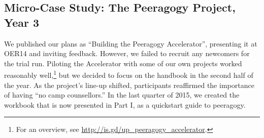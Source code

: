 \subsection{{\tiny Micro-}Case Study: The Peeragogy Project, Year 3}

We published our plans as ``Building the Peeragogy Accelerator'',
presenting it at OER14 and inviting feedback.  However, we failed to
recruit any newcomers for the trial run.  Piloting the Accelerator
with some of our own projects worked reasonably well,\footnote{For an
overview, see \url{http://is.gd/up_peeragogy_accelerator}.} but we
decided to focus on the handbook in the second half of the year.  As
the project's line-up shifted, participants reaffirmed the importance
of having ``no camp counsellors.''  In the last quarter of 2015,
we created the workbook that is now presented in Part I, as a
quickstart guide to peeragogy.

